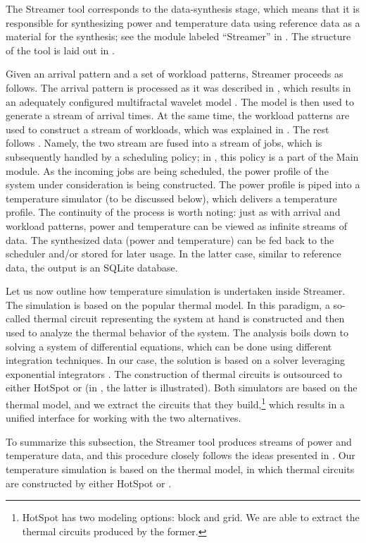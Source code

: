 
The Streamer tool corresponds to the data-synthesis stage, which means that it
is responsible for synthesizing power and temperature data using reference data
as a material for the synthesis; see the module labeled ``Streamer'' in
. The structure of the tool is laid out in .

Given an arrival pattern and a set of workload patterns, Streamer proceeds as
follows. The arrival pattern is processed as it was described in ,
which results in an adequately configured multifractal wavelet model
\cite{riedi1999}. The model is then used to generate a stream of arrival times.
At the same time, the workload patterns are used to construct a stream of
workloads, which was explained in . The rest follows
. Namely, the two stream are fused into a stream of jobs,
which is subsequently handled by a scheduling policy; in , this
policy is a part of the Main module. As the incoming jobs are being scheduled,
the power profile of the system under consideration is being constructed. The
power profile is piped into a temperature simulator (to be discussed below),
which delivers a temperature profile. The continuity of the process is worth
noting: just as with arrival and workload patterns, power and temperature can be
viewed as infinite streams of data. The synthesized data (power and temperature)
can be fed back to the scheduler and/or stored for later usage. In the latter
case, similar to reference data, the output is an SQLite database.

Let us now outline how temperature simulation is undertaken inside Streamer. The
simulation is based on the popular thermal  model. In this paradigm, a
so-called thermal  circuit representing the system at hand is constructed
and then used to analyze the thermal behavior of the system. The analysis boils
down to solving a system of differential equations, which can be done using
different integration techniques. In our case, the solution is based on a solver
leveraging exponential integrators \cite{hochbruck2010, ukhov2012}. The
construction of thermal circuits is outsourced to either HotSpot
\cite{skadron2004} or  \cite{sridhar2010} (in , the
latter is illustrated). Both simulators are based on the thermal  model,
and we extract the circuits that they build,\footnote{HotSpot has two modeling
options: block and grid. We are able to extract the thermal circuits produced by
the former.} which results in a unified interface for working with the two
alternatives.

To summarize this subsection, the Streamer tool produces streams of power and
temperature data, and this procedure closely follows the ideas presented in
. Our temperature simulation is based on the thermal 
model, in which thermal circuits are constructed by either HotSpot or
.

